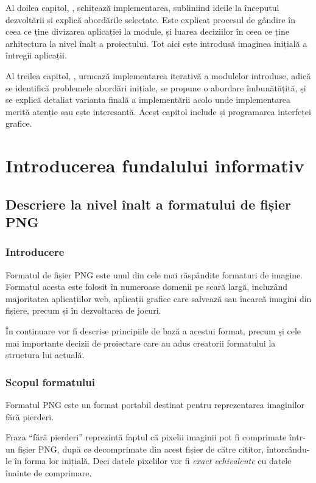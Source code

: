 \documentclass[a4paper,12pt]{report}
\begin{document}
Al doilea capitol, , schițează implementarea,
subliniind ideile la începutul dezvoltării și explică abordările selectate.
Este explicat procesul de gândire în ceea ce ține divizarea aplicației la module,
și luarea deciziilor în ceea ce ține arhitectura la nivel înalt a proiectului.
Tot aici este introdusă imaginea inițială a întregii aplicații.

Al treilea capitol, ,
urmează implementarea iterativă a modulelor introduse,
adică se identifică problemele abordări inițiale,
se propune o abordare îmbunătățită, și se explică detaliat varianta finală a implementării
acolo unde implementarea merită atenție sau este interesantă.
Acest capitol include și programarea interfeței grafice.

\chapter{Introducerea fundalului informativ}\label{intro_chapter_title}

\section{Descriere la nivel înalt a formatului de fișier \acs{PNG}}

\subsection{Introducere}

Formatul de fișier \ac{PNG} este unul din cele mai răspândite formaturi de imagine.
Formatul acesta este folosit în numeroase domenii pe scară largă, incluzând majoritatea aplicațiilor
web, aplicații grafice care salvează sau încarcă imagini din fișiere, precum și în dezvoltarea de jocuri.

În continuare vor fi descrise principiile de bază a acestui format,
precum și cele mai importante decizii de proiectare care au adus creatorii formatului la structura lui actuală.

\subsection{Scopul formatului}

Formatul \ac{PNG} este un format portabil destinat pentru reprezentarea imaginilor fără pierderi.

Fraza ``fără pierderi'' reprezintă faptul că pixelii imaginii
pot fi comprimate într-un fișier \ac{PNG},
după ce decomprimate din acest fișier de către cititor,
întorcându-le în forma lor inițială.
Deci datele pixelilor vor fi \textit{exact echivalente} cu datele înainte de comprimare.
\end{document}
